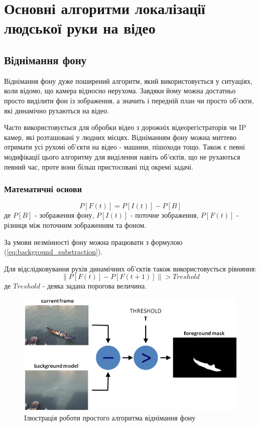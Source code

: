 \section{Основні алгоритми локалізації людської руки на відео}
\jointitles
\subsection{Віднімання фону}
Віднімання фону дуже поширений алгоритм, який використовується у ситуаціях, коли відомо, що камера відносно нерухома. Завдяки йому можна достатньо просто виділити фон із зображення, а значить і передній план чи просто об'єкти, які динамічно рухаються на відео.

Часто використовується для обробки відео з дорожніх відеорегістраторів чи IP камер, які розташовані у людних місцях. Відніманням фону можна миттево отримати усі рухомі об'єкти на відео - машини, пішоходи тощо. Також є певні модифікації цього алгоритму для виділення навіть об'єктів, що не рухаються певний час, проте вони більш пристосовані під окремі задачі.

\subsubsection{Математичні основи}
\begin{equation}
\label{eq:background_substraction}
P[F(t)] = P[I(t)] - P[B]
\end{equation}
де $P[B]$ - зображення фону, $P[I(t)]$ - поточне зображення, $P[F(t)]$ - різниця між поточним зображенням та фоном.

За умови незмінності фону можна працювати з формулою (\ref{eq:background_substraction}).

Для відслідковування рухів динамічних об'єктів також використовується рівняння:
\begin{equation}
\label{eq:frames_difference}
\|P[F(t)] - P[F(t+1)]\| > Treshold
\end{equation}
де $Treshold$ - деяка задана порогова величина.

\begin{figure}[H]
	\includegraphics[width=0.9\linewidth]{theory/img/background_substraction}
	\caption{Ілюстрація роботи простого алгоритма віднімання фону}
\end{figure}

